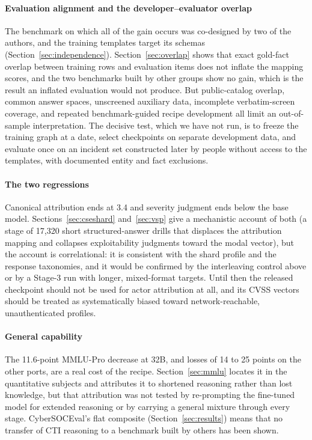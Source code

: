 \documentclass[twocolumn]{svjour3}
\begin{document}
\paragraph{Evaluation alignment and the developer--evaluator overlap}
The benchmark on which all of the gain occurs was co-designed by two of the authors, and the training templates target its schemas (Section~\ref{sec:independence}). Section~\ref{sec:overlap} shows that exact gold-fact overlap between training rows and evaluation items does not inflate the mapping scores, and the two benchmarks built by other groups show no gain, which is the result an inflated evaluation would not produce. But public-catalog overlap, common answer spaces, unscreened auxiliary data, incomplete verbatim-screen coverage, and repeated benchmark-guided recipe development all limit an out-of-sample interpretation. The decisive test, which we have not run, is to freeze the training graph at a date, select checkpoints on separate development data, and evaluate once on an incident set constructed later by people without access to the templates, with documented entity and fact exclusions.

\paragraph{The two regressions}
Canonical attribution ends at 3.4 and severity judgment ends below the base model. Sections~\ref{sec:cseshard} and~\ref{sec:vsp} give a mechanistic account of both (a stage of 17,320 short structured-answer drills that displaces the attribution mapping and collapses exploitability judgments toward the modal vector), but the account is correlational: it is consistent with the shard profile and the response taxonomies, and it would be confirmed by the interleaving control above or by a Stage-3 run with longer, mixed-format targets. Until then the released checkpoint should not be used for actor attribution at all, and its CVSS vectors should be treated as systematically biased toward network-reachable, unauthenticated profiles.

\paragraph{General capability}
The 11.6-point MMLU-Pro decrease at 32B, and losses of 14 to 25 points on the other ports, are a real cost of the recipe. Section~\ref{sec:mmlu} locates it in the quantitative subjects and attributes it to shortened reasoning rather than lost knowledge, but that attribution was not tested by re-prompting the fine-tuned model for extended reasoning or by carrying a general mixture through every stage. CyberSOCEval's flat composite (Section~\ref{sec:results}) means that no transfer of CTI reasoning to a benchmark built by others has been shown.
\end{document}
